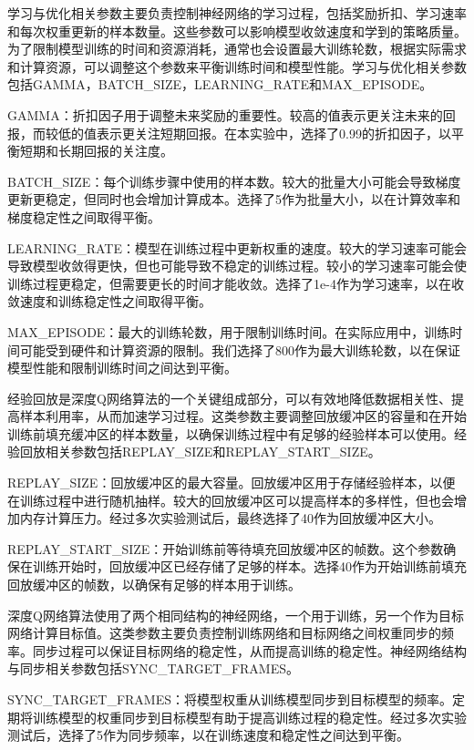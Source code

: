 学习与优化相关参数主要负责控制神经网络的学习过程，包括奖励折扣、学习速率和每次权重更新的样本数量。这些参数可以影响模型收敛速度和学到的策略质量。为了限制模型训练的时间和资源消耗，通常也会设置最大训练轮数，根据实际需求和计算资源，可以调整这个参数来平衡训练时间和模型性能。学习与优化相关参数包括GAMMA，BATCH\_SIZE，LEARNING\_RATE和MAX\_EPISODE。

GAMMA：折扣因子用于调整未来奖励的重要性。较高的值表示更关注未来的回报，而较低的值表示更关注短期回报。在本实验中，选择了0.99的折扣因子，以平衡短期和长期回报的关注度。

BATCH\_SIZE：每个训练步骤中使用的样本数。较大的批量大小可能会导致梯度更新更稳定，但同时也会增加计算成本。选择了5作为批量大小，以在计算效率和梯度稳定性之间取得平衡。

LEARNING\_RATE：模型在训练过程中更新权重的速度。较大的学习速率可能会导致模型收敛得更快，但也可能导致不稳定的训练过程。较小的学习速率可能会使训练过程更稳定，但需要更长的时间才能收敛。选择了1e-4作为学习速率，以在收敛速度和训练稳定性之间取得平衡。

MAX\_EPISODE：最大的训练轮数，用于限制训练时间。在实际应用中，训练时间可能受到硬件和计算资源的限制。我们选择了800作为最大训练轮数，以在保证模型性能和限制训练时间之间达到平衡。

经验回放是深度Q网络算法的一个关键组成部分，可以有效地降低数据相关性、提高样本利用率，从而加速学习过程。这类参数主要调整回放缓冲区的容量和在开始训练前填充缓冲区的样本数量，以确保训练过程中有足够的经验样本可以使用。经验回放相关参数包括REPLAY\_SIZE和REPLAY\_START\_SIZE。

REPLAY\_SIZE：回放缓冲区的最大容量。回放缓冲区用于存储经验样本，以便在训练过程中进行随机抽样。较大的回放缓冲区可以提高样本的多样性，但也会增加内存计算压力。经过多次实验测试后，最终选择了40作为回放缓冲区大小。

REPLAY\_START\_SIZE：开始训练前等待填充回放缓冲区的帧数。这个参数确保在训练开始时，回放缓冲区已经存储了足够的样本。选择40作为开始训练前填充回放缓冲区的帧数，以确保有足够的样本用于训练。

深度Q网络算法使用了两个相同结构的神经网络，一个用于训练，另一个作为目标网络计算目标值。这类参数主要负责控制训练网络和目标网络之间权重同步的频率。同步过程可以保证目标网络的稳定性，从而提高训练的稳定性。神经网络结构与同步相关参数包括SYNC\_TARGET\_FRAMES。

SYNC\_TARGET\_FRAMES：将模型权重从训练模型同步到目标模型的频率。定期将训练模型的权重同步到目标模型有助于提高训练过程的稳定性。经过多次实验测试后，选择了5作为同步频率，以在训练速度和稳定性之间达到平衡。

